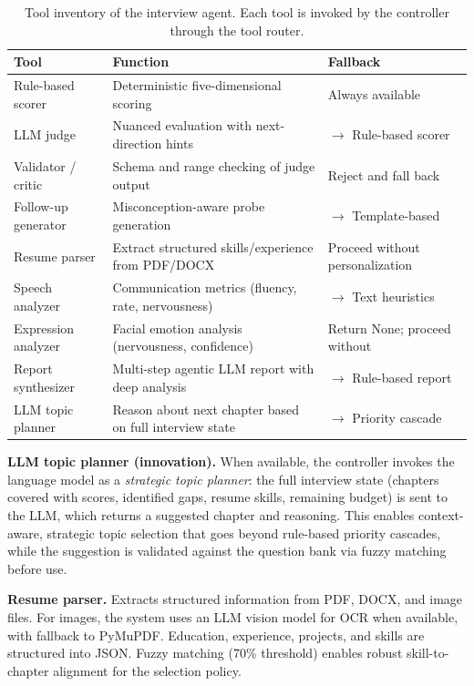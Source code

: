﻿\documentclass[final,3p,times,authoryear]{elsarticle}
\begin{document}
\begin{table}[H]
\centering
\caption{Tool inventory of the interview agent. Each tool is invoked by the controller through the tool router.}
\label{tab:tools}
\footnotesize
\begin{tabularx}{\textwidth}{l Y Y}
\toprule
\textbf{Tool} & \textbf{Function} & \textbf{Fallback} \\
\midrule
Rule-based scorer & Deterministic five-dimensional scoring & Always available \\
LLM judge & Nuanced evaluation with next-direction hints & $\rightarrow$ Rule-based scorer \\
Validator / critic & Schema and range checking of judge output & Reject and fall back \\
Follow-up generator & Misconception-aware probe generation & $\rightarrow$ Template-based \\
Resume parser & Extract structured skills/experience from PDF/DOCX & Proceed without personalization \\
Speech analyzer & Communication metrics (fluency, rate, nervousness) & $\rightarrow$ Text heuristics \\
Expression analyzer & Facial emotion analysis (nervousness, confidence) & Return None; proceed without \\
Report synthesizer & Multi-step agentic LLM report with deep analysis & $\rightarrow$ Rule-based report \\
LLM topic planner & Reason about next chapter based on full interview state & $\rightarrow$ Priority cascade \\
\bottomrule
\end{tabularx}
\end{table}

\noindent \textbf{LLM topic planner (innovation).} When available, the controller invokes the language model as a \emph{strategic topic planner}: the full interview state (chapters covered with scores, identified gaps, resume skills, remaining budget) is sent to the LLM, which returns a suggested chapter and reasoning. This enables context-aware, strategic topic selection that goes beyond rule-based priority cascades, while the suggestion is validated against the question bank via fuzzy matching before use.

\noindent \textbf{Resume parser.} Extracts structured information from PDF, DOCX, and image files. For images, the system uses an LLM vision model for OCR when available, with fallback to PyMuPDF. Education, experience, projects, and skills are structured into JSON. Fuzzy matching (70\% threshold) enables robust skill-to-chapter alignment for the selection policy.
\end{document}
